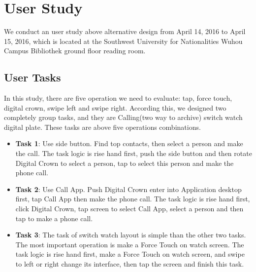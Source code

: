 \chapter{User Study}

We conduct an user study above alternative design from April 14, 2016 to April 15, 2016, which is located at the Southwest University for Nationalities Wuhou Campus Bibliothek ground floor reading room.

\section{User Tasks}

In this study, there are five operation we need to evaluate: tap, force touch, digital crown, swipe left and swipe right. According this, we designed two completely group tasks, and they are Calling(two way to archive) switch watch digital plate. These tasks are above five operations combinations.

\begin{itemize}
    \kaishu
    \item \textbf{Task 1}: Use side button. Find top contacts, then select a person and make the call. The task logic is rise hand first, push the side button and then rotate Digital Crown to select a person, tap to select this person and make the phone call.
    \item \textbf{Task 2}: Use Call App. Push Digital Crown enter into Application desktop first, tap Call App then make the phone call. The task logic is rise hand first, click Digital Crown, tap screen to select Call App, select a person and then tap to make a phone call.
    \item \textbf{Task 3}: The task of switch watch layout is simple than the other two tasks. The most important operation is make a Force Touch on watch screen. The task logic is rise hand first, make a Force Touch on watch screen, and swipe to left or right change its interface, then tap the screen and finish this task.
\end{itemize}

